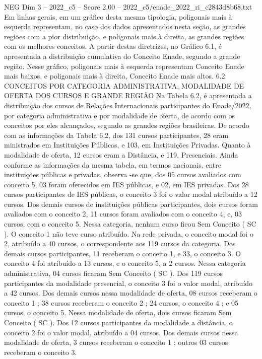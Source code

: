 \begin{textsample}{NEG Dim 3 – 2022\_c5 – Score 2.00 – 2022\_c5/enade\_2022\_ri\_c2843d8b68.txt}
Em linhas gerais, em um gráfico desta mesma tipologia, poligonais mais à esquerda representam, no caso dos dados apresentados nesta seção, as grandes regiões com a pior distribuição, e poligonais mais à direita, as grandes regiões com os melhores conceitos.
A partir destas diretrizes, no Gráfico 6.1, é apresentada a distribuição cumulativa do Conceito Enade, segundo a grande região.
Nesse gráfico, poligonais mais à esquerda representam Conceito Enade mais baixos, e poligonais mais à direita, Conceito Enade mais altos. 6.2 CONCEITOS POR CATEGORIA ADMINISTRATIVA, MODALIDADE DE OFERTA DOS CURSOS E GRANDE REGIÃO Na Tabela 6.2, é apresentada a distribuição dos cursos de Relações Internacionais participantes do Enade/2022, por categoria administrativa e por modalidade de oferta, de acordo com os conceitos por eles alcançados, segundo as grandes regiões brasileiras.
De acordo com as informações da Tabela 6.2, dos 131 cursos participantes, 28 eram ministrados em Instituições Públicas, e 103, em Instituições Privadas.
Quanto à modalidade de oferta, 12 cursos eram a Distância, e 119, Presenciais.
Ainda conforme as informações da mesma tabela, em termos nacionais, entre instituições públicas e privadas, observa -se que, dos 05 cursos avaliados com conceito 5, 03 foram oferecidos em IES públicas, e 02, em IES privadas.
Dos 28 cursos participantes de IES públicas, o conceito 3 foi o valor modal atribuído a 12 cursos.
Dos demais cursos de instituições públicas participantes, dois cursos foram avaliados com o conceito 2, 11 cursos foram avaliados com o conceito 4, e, 03 cursos, com o conceito 5.
Nessa categoria, nenhum curso ficou Sem Conceito ( SC ).
O conceito 1 não teve curso atribuído.
Na rede privada, o conceito modal foi o 2, atribuído a 40 cursos, o correspondente aos 119 cursos da categoria.
Dos demais cursos participantes, 11 receberam o conceito 1, e 33, o conceito 3.
O conceito 4 foi atribuído a 13 cursos, e o conceito 5, a 2 cursos.
Nessa categoria administrativa, 04 cursos ficaram Sem Conceito ( SC ).
Dos 119 cursos participantes da modalidade presencial, o conceito 3 foi o valor modal, atribuído a 42 cursos.
Dos demais cursos nessa modalidade de oferta, 08 cursos receberam o conceito 1 ; 38 cursos receberam o conceito 2 ; 24 cursos, o conceito 4 ; e 05 cursos, o conceito 5.
Nessa modalidade de oferta, dois cursos ficaram Sem Conceito ( SC ).
Dos 12 cursos participantes da modalidade a distância, o conceito 2 foi o valor modal, atribuído a 04 cursos.
Dos demais cursos nessa modalidade de oferta, 3 cursos receberam o conceito 1 ; outros 03 cursos receberam o conceito 3.

\end{textsample}
